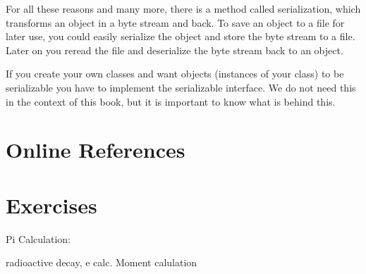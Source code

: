 For all
these reasons and many more, there is a method called serialization,
which transforms an object in a byte stream and back. 
To save an object to a file for later use, you could easily serialize
the object and store the byte stream to a file. Later on you reread
the file and deserialize the byte stream back to an object. 

If you create your own classes and want objects (instances of your 
class) to be serializable you have to implement the serializable interface.
We do not need this in the context of this book, but it is
important to know what is behind this.  







\section{Online References}
\label{sec:Online_Refernces}


\section{Exercises}
Pi Calculation:


radioactive decay, e calc.
Moment calulation


\nocite{FLANAGAN-EXAMPLES}
\nocite{GOSLING}








